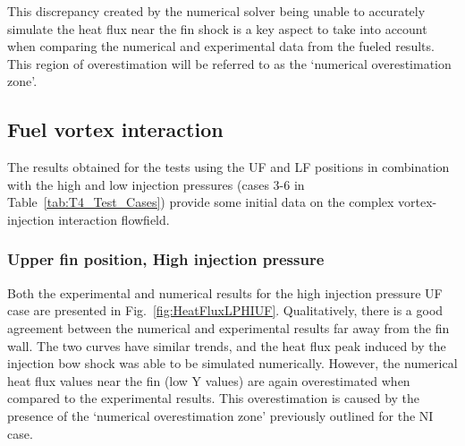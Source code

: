 \documentclass{AIAA}
\begin{document}
This discrepancy created by the numerical solver being unable to accurately simulate the heat flux near the fin shock is a key aspect to take into account when comparing the numerical and experimental data from the fueled results. 
This region of overestimation will be referred to as the `numerical overestimation zone'.


\subsection{Fuel vortex interaction}

The results obtained for the tests using the UF and LF positions in combination with the high and low injection pressures (cases 3-6 in Table~\ref{tab:T4_Test_Cases}) provide some initial data on the complex vortex-injection interaction flowfield.

\subsubsection{Upper fin position, High injection pressure}

Both the experimental and numerical results for the high injection pressure UF case are presented in Fig.~\ref{fig:HeatFluxLPHIUF}.
Qualitatively, there is a good agreement between the numerical and experimental results far away from the fin wall.
The two curves have similar trends, and the heat flux peak induced by the injection bow shock was able to be simulated numerically.
However, the numerical heat flux values near the fin (low Y values) are again overestimated when compared to the experimental results.
This overestimation is caused by the presence of the `numerical overestimation zone' previously outlined for the NI case.
\end{document}
